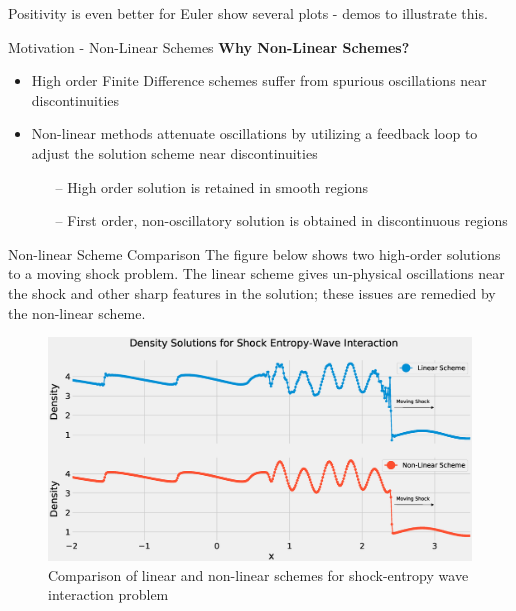 \documentclass[9pt]{beamer}
\begin{document}
\begin{frame}{Positivity is even better for Euler}
  show several plots - demos to illustrate this.
\end{frame}


\begin{frame}{Motivation - Non-Linear Schemes}
\textbf{Why Non-Linear Schemes?}
\begin{itemize}
\item High order Finite Difference schemes suffer from spurious oscillations near discontinuities
\item Non-linear methods attenuate oscillations by utilizing a feedback loop to adjust the solution scheme near discontinuities
\begin{itemize}
\item[--] High order solution is retained in smooth regions 
\item[--] First order, non-oscillatory solution is obtained in discontinuous regions
\end{itemize}
\end{itemize}
\end{frame}



\begin{frame}{Non-linear Scheme Comparison}
The figure below shows two high-order solutions to a moving shock problem.  The linear scheme gives un-physical oscillations near the shock and other sharp features in the solution;  these issues are remedied by the non-linear scheme.
\begin{figure}[H]
\centering
\includegraphics[scale=0.25]{DensitySolutions.eps}\caption{Comparison of linear and non-linear schemes for shock-entropy wave interaction problem}
  \label{fig:BurgersZoom}
\end{figure}
\end{frame}
\end{document}
